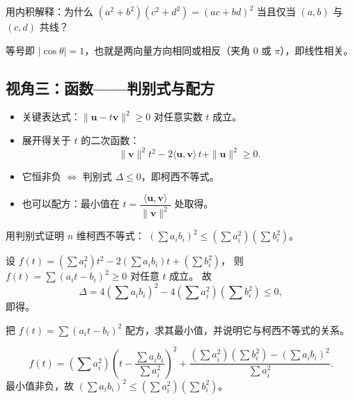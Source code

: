 \begin{explore}
\begin{problem}
用内积解释：为什么 $(a^2+b^2)(c^2+d^2)=(ac+bd)^2$ 当且仅当 $(a,b)$ 与 $(c,d)$ 共线？
\end{problem}
\begin{solution}
等号即 $|\cos\theta|=1$，也就是两向量方向相同或相反（夹角 $0$ 或 $\pi$），即线性相关。
\end{solution}

\subsection{视角三：函数——判别式与配方}

\begin{itemize}
  \item 关键表达式：$\|\mathbf u-t\mathbf v\|^2\geq0$ 对任意实数 $t$ 成立。
  \item 展开得关于 $t$ 的二次函数：
  \[
    \|\mathbf v\|^2t^2-2\langle\mathbf u,\mathbf v\rangle\,t+\|\mathbf u\|^2\geq0.
  \]
  \item 它恒非负 $\iff$ 判别式 $\Delta\leq0$，即柯西不等式。
  \item 也可以配方：最小值在 $t=\dfrac{\langle\mathbf u,\mathbf v\rangle}{\|\mathbf v\|^2}$ 处取得。
\end{itemize}

\begin{example}
用判别式证明 $n$ 维柯西不等式：
$\left(\sum a_ib_i\right)^2\leq\left(\sum a_i^2\right)\left(\sum b_i^2\right)$。
\end{example}
\begin{solution}
设 $f(t)=\left(\sum a_i^2\right)t^2-2\left(\sum a_ib_i\right)t+\left(\sum b_i^2\right)$，
则 $f(t)=\sum(a_it-b_i)^2\geq0$ 对任意 $t$ 成立。
故
\[
  \Delta=4\left(\sum a_ib_i\right)^2-4\left(\sum a_i^2\right)\left(\sum b_i^2\right)\leq0,
\]
即得。
\end{solution}

\begin{problem}
把 $f(t)=\sum(a_it-b_i)^2$ 配方，求其最小值，并说明它与柯西不等式的关系。
\end{problem}
\begin{solution}
\[
  f(t)=\left(\sum a_i^2\right)\left(t-\frac{\sum a_ib_i}{\sum a_i^2}\right)^2
  +\frac{\left(\sum a_i^2\right)\left(\sum b_i^2\right)-\left(\sum a_ib_i\right)^2}{\sum a_i^2}.
\]
最小值非负，故 $\left(\sum a_ib_i\right)^2\leq\left(\sum a_i^2\right)\left(\sum b_i^2\right)$。
\end{solution}


\end{explore}
